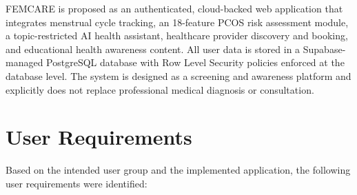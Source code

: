 FEMCARE is proposed as an authenticated, cloud-backed web application that integrates menstrual cycle tracking, an 18-feature PCOS risk assessment module, a topic-restricted AI health assistant, healthcare provider discovery and booking, and educational health awareness content. All user data is stored in a Supabase-managed PostgreSQL database with Row Level Security policies enforced at the database level. The system is designed as a screening and awareness platform and explicitly does not replace professional medical diagnosis or consultation.

\section{User Requirements}
\label{sec:user-req}

Based on the intended user group and the implemented application, the following user requirements were identified:

